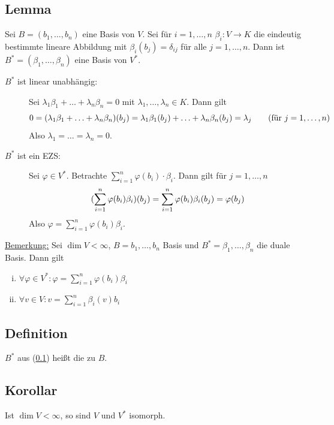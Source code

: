 \subsection[Lemma: Basis des Dualraums]{Lemma} %
\label{sub:122}
Sei $B=(b_1, \ldots , b_n)$ eine Basis von $V$. Sei für $i=1, \ldots ,n$ $\beta_i : V \to K$ die eindeutig bestimmte lineare Abbildung mit 
$\beta_i (b_j) = \delta_{ij}$ für alle $j=1, \ldots ,n$. Dann ist $B^* = (\beta_1, \ldots , \beta_n)$ eine Basis von $V^*$.
\begin{description}
	\item[$B^*$ ist linear unabhängig:] Sei $\lambda_1 \beta_1 + \ldots + \lambda_n \beta_n=0$ mit $\lambda_1, \ldots , \lambda_n \in K$. Dann gilt
	\[
		0=(\lambda_1 \beta_1 + \ldots + \lambda_n \beta_n) (b_j) = \lambda_1 \beta_1(b_j) + \ldots + \lambda_n \beta_n (b_j) = \lambda_j \tag{für $j=1, \ldots ,n$}
	\]
	Also $\lambda_1 = \ldots = \lambda_n =0$. 
	\item[$B^*$ ist ein EZS:] Sei $\varphi \in V^*$. Betrachte $\sum_{i=1}^{n} \varphi (b_i) \cdot \beta_i$. Dann gilt für $j=1, \ldots ,n$
	\[
		(\sum_{i=1}^{n}  \varphi(b_i) \beta_i) (b_j) = \sum_{i=1}^{n} \varphi(b_i) \beta_i (b_j) = \varphi(b_j) 
	\]
	Also $\varphi = \sum_{i=1}^{n} \varphi(b_i) \beta_i$. \bewende
\end{description}
\uline{Bemerkung:} Sei $\dim V < \infty$, $B=b_1, \ldots ,b_n$ Basis und $B^* =\beta_1 , \ldots , \beta_n$ die duale Basis. Dann gilt
\begin{enumerate}[(i)]
	\item $\forall \varphi\in V^* : \varphi = \sum_{i=1}^{n} \varphi(b_i) \beta_i$
	\item $\forall v \in V : v = \sum_{i=1}^{n} \beta_i (v) b_i$ 
\end{enumerate}

\subsection[Definition: Duale Basis]{Definition} %
\label{sub:123}
$B^*$ aus (\ref{sub:122}) heißt die  zu $B$. 

\subsection[Korollar: Isomorphismus zwischen  endlich dimensionalem Vektorraum und seinem Dualraum]{Korollar} %
\label{sub:124}
Ist $\dim V < \infty$, so sind $V$ und $V^*$ isomorph.


